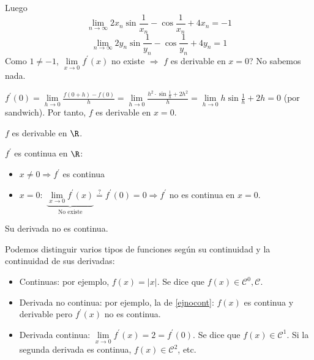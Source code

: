 \begin{example}
\begin{enumerate}
		      Luego
		      \[
			      \lim\limits_{n  \to \infty} 2x_n \sin \frac{1}{x_n} - \cos \frac{1}{x_n} + 4x_n = -1
		      \]
		      \[
			      \lim\limits_{n \to \infty} 2y_n \sin \frac{1}{y_n} - \cos \frac{1}{y_n} + 4y_n = 1
		      \]
		      Como \(1 \neq  -1 \), \(\lim\limits_{x  \to 0 } f^\prime (x)\) no existe \(\Rightarrow \) \(f \) es derivable en \(x = 0 \)? No sabemos nada.

		      \(f^\prime (0) = \lim\limits_{h  \to 0} \frac{f(0 + h) - f(0 )}{h } = \lim\limits_{h  \to 0 } \frac{h^{2 } \cdot \sin \frac{1}{h} + 2h^{2}  }{h} = \lim\limits_{h  \to 0 } h \sin \frac{1}{h} + 2h = 0\) (por sandwich). Por tanto, \(f \) es derivable en \(x = 0 \).

		      \(f \) es derivable en \(\R \).

		      \vspace{0.2cm}
		      \(f^\prime \) es continua en \(\R \):
		      \begin{itemize}
			      \item \(x \neq 0 \Rightarrow f^\prime \) es continua
			      \item \(x = 0:\) \(\underbrace{\lim\limits_{x  \to 0 } f^\prime (x)}_{\text{No existe} } \overset{?}{=} f^\prime (0) = 0 \Rightarrow f^\prime \) no es continua en \(x = 0\).
		      \end{itemize}
		      Su derivada no es continua.
	\end{enumerate}
\end{example}
Podemos distinguir varios tipos de funciones según su continuidad y la continuidad de sus derivadas:
\begin{itemize}
	\item Continuas: por ejemplo, \(f(x) = \left\vert x  \right\vert \). Se dice que \(f(x) \in \mathscr{C}^{0}, \mathscr{C} \).
	\item Derivada no continua: por ejemplo, la de \ref{ejnocont}: \(f(x )\) es continua y derivable pero \(f^\prime (x)\) no es continua.
	\item Derivada continua: \(\lim\limits_{x  \to 0 } f^\prime (x) = 2  = f^\prime (0)\). Se dice que \(f(x) \in \mathscr{C}^{1} \). Si la segunda derivada es continua, \(f(x) \in \mathscr{C}^{2} \), etc.
\end{itemize}

